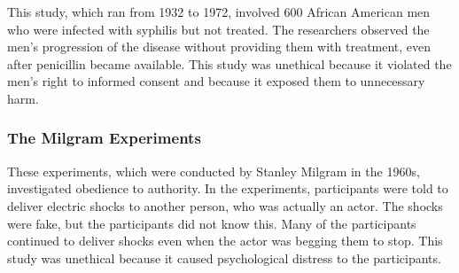 \documentclass[
  b5paper]{book}
\begin{document}
This study, which ran from 1932 to 1972, involved 600 African American men who were infected with syphilis but not treated. The researchers observed the men's progression of the disease without providing them with treatment, even after penicillin became available. This study was unethical because it violated the men's right to informed consent and because it exposed them to unnecessary harm.

\hypertarget{the-milgram-experiments}{%
\subsubsection*{The Milgram Experiments}\label{the-milgram-experiments}}

These experiments, which were conducted by Stanley Milgram in the 1960s, investigated obedience to authority. In the experiments, participants were told to deliver electric shocks to another person, who was actually an actor. The shocks were fake, but the participants did not know this. Many of the participants continued to deliver shocks even when the actor was begging them to stop. This study was unethical because it caused psychological distress to the participants.
\end{document}
